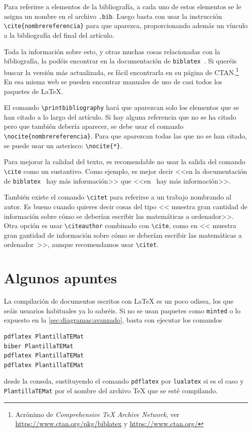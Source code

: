 \documentclass[%
extracommands,%
]{revistaanem}
\begin{document}
Para referirse a elementos de la bibliografía, a cada uno de estos elementos se le asigna un nombre en el archivo \verb+.bib+.
Luego basta con usar la instrucción \verb+\cite{nombrereferencia}+ para que aparezca, proporcionando además un vínculo a la bibliografía del final del artículo.

Toda la información sobre esto, y otras muchas cosas relacionadas con la bibliografía, la podéis encontrar en la documentación de \verb+biblatex+~\cite{biblatex}.
Si queréis buscar la versión más actualizada, es fácil encontrarla en su página de CTAN.\footnote{Acrónimo de \emph{Comprehensive \protect\TeX{} Archive Network}, ver \url{https://www.ctan.org/pkg/biblatex} y \url{https://www.ctan.org/}}
En esa misma web se pueden encontrar manuales de uso de casi todos los paquetes de \LaTeX.

\begin{nota}
El comando \verb+\printbibliography+ hará que aparezcan solo los elementos que se han citado a lo largo del artículo.
Si hay alguna referencia que no se ha citado pero que también debería aparecer, se debe usar el comando \verb+\nocite{nombrereferencia}+.
Para que aparezcan todas las que no se han citado, se puede usar un asterisco: \verb+\nocite{*}+.
\end{nota}

\begin{nota}
Para mejorar la calidad del texto, es recomendable no usar la salida del comando \verb+\cite+ como un sustantivo.
Como ejemplo, es mejor decir <<en la documentación de \texttt{biblatex}~\cite{biblatex} hay más información>> que <<en~\cite{biblatex} hay más información>>.

También existe el comando \verb+\citet+ para referirse a un trabajo nombrando al autor.
Es bueno cuando quieres decir cosas del tipo <<\citet{bezosOM} muestra gran cantidad de información sobre cómo se deberían escribir las matemáticas a ordenador>>. Otra opción es usar \verb+\citeauthor+ combinado con \verb+\cite+, como en <<\citeauthor{bezosOM} muestra gran gantidad de información sobre cómo se deberían escribir las matemáticas a ordenador~\cite{bezosOM}>>, aunque recomendamos usar \verb+\citet+.
\end{nota}

\section{Algunos apuntes}\label{sec:apuntes}
La compilación de documentos escritos con \LaTeX{} es un poco odisea, los que seáis usuarios habituales ya lo sabréis.
Si no se usan paquetes como \verb+minted+ o lo expuesto en la \cref{sec:diagramas:avanzado}, basta con ejecutar los comandos
\begin{verbatim}
pdflatex PlantillaTEMat
biber PlantillaTEMat
pdflatex PlantillaTEMat
pdflatex PlantillaTEMat
\end{verbatim}
desde la consola, sustituyendo el comando \verb+pdflatex+ por \verb+lualatex+ si es el caso y \verb+PlantillaTEMat+ por el nombre del archivo \TeX{} que se esté compilando.
\end{document}
